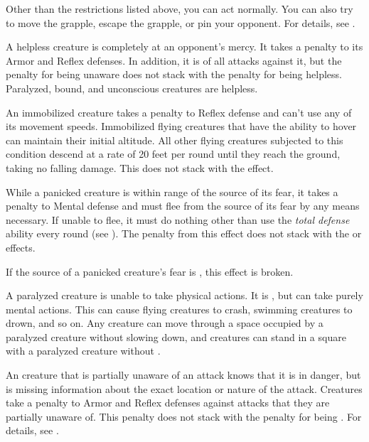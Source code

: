     Other than the restrictions listed above, you can act normally. You can also try to move the grapple, escape the grapple, or pin your opponent. For details, see .

     A helpless creature is completely at an opponent's mercy.
    It takes a  penalty to its Armor and Reflex defenses.
    In addition, it is \unaware of all attacks against it, but the penalty for being unaware does not stack with the penalty for being helpless.
    Paralyzed, bound, and unconscious creatures are helpless.

     An immobilized creature takes a  penalty to Reflex defense and can't use any of its movement speeds.
    Immobilized flying creatures that have the ability to hover can maintain their initial altitude.
    All other flying creatures subjected to this condition descend at a rate of 20 feet per round until they reach the ground, taking no falling damage.
    This does not stack with the \slowed effect.

     While a panicked creature is within \rngmed range of the source of its fear, it takes a  penalty to Mental defense and must flee from the source of its fear by any means necessary.
    If unable to flee, it must do nothing other than use the \textit{total defense} ability every round (see ).
    The penalty from this effect does not stack with the \frightened or \panicked effects.

    If the source of a panicked creature's fear is , this effect is broken.

     A paralyzed creature is unable to take physical actions. It is \helpless, but can take purely mental actions. This can cause flying creatures to crash, swimming creatures to drown, and so on. Any creature can move through a space occupied by a paralyzed creature without slowing down, and creatures can stand in a square with a paralyzed creature without \squeezing.

     An creature that is partially unaware of an attack knows that it is in danger, but is missing information about the exact location or nature of the attack.
    Creatures take a  penalty to Armor and Reflex defenses against attacks that they are partially unaware of.
    This penalty does not stack with the penalty for being \unaware.
    For details, see .


